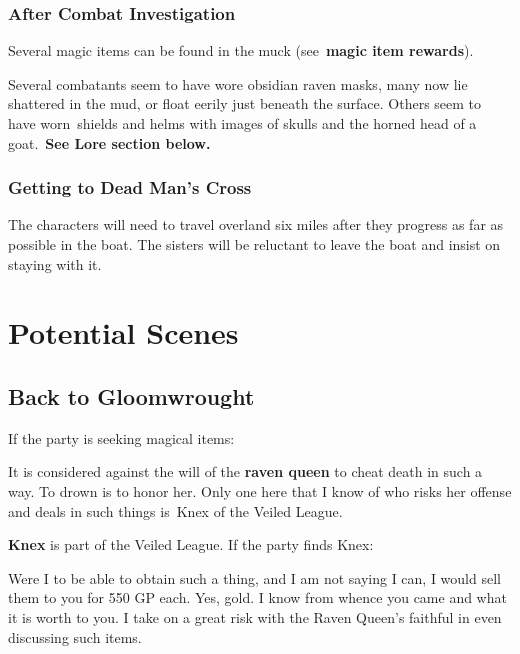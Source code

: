 \documentclass[10pt,twocolumn]{article}
\renewcommand{\textsc}[1]{\XCharterSC#1}
\let\oldtextbf\textbf
\renewcommand{\textbf}[1]{\oldtextbf{{#1}}}
\renewenvironment{quote}
  {%
    \begingroup
      \setlength{\parindent}{1em}%
      \setlength{\parskip}{0pt}%
      \begin{tcolorbox}[myquote,
        before upper={%
          \let\textbf\oldtextbf
          \setlength{\parindent}{1.5em}%
          \setlength{\parskip}{0pt}%
          \noindent              %
        }%
      ]%
  }
  {%
      \end{tcolorbox}%
    \endgroup
  }
\begin{document}
\subsubsection{After Combat
Investigation}\label{after-combat-investigation}

Several magic items can be found in the muck
(see~\textcolor{keywordcolor}{\textbf{\textsc{magic item rewards}}}).

Several combatants seem to have wore obsidian raven masks, many now lie
shattered in the mud, or float eerily just beneath the surface. Others
seem to have worn~shields and helms with images of skulls and the horned
head of a goat.~\textbf{See Lore section below.}

\subsubsection{Getting to Dead Man's
Cross}\label{getting-to-dead-mans-cross}

The characters will need to travel overland six miles after they
progress as far as possible in the boat. The sisters will be reluctant
to leave the boat and insist on staying with it.

\section{Potential Scenes}\label{potential-scenes}

\subsection{Back to Gloomwrought}\label{back-to-gloomwrought}

If the party is seeking magical items:

\begin{quote}
It is considered against the will of the
\textcolor{keywordcolor}{\textbf{\textsc{raven queen}}} to cheat death
in such a way. To drown is to honor her. Only one here that I know of
who risks her offense and deals in such things is~Knex of the Veiled
League.
\end{quote}

\textbf{Knex} is part of the Veiled League. If the party finds Knex:

\begin{quote}
Were I to be able to obtain such a thing, and I am not saying I can, I
would sell them to you for 550 GP each. Yes, gold. I know from whence
you came and what it is worth to you. I take on a great risk with the
Raven Queen's faithful in even discussing such items.
\end{quote}
\end{document}
